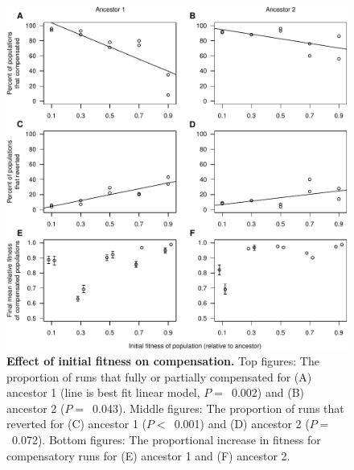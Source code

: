 \begin{doublespace}
\begin{figure}
\begin{center}
\includegraphics[width=\linewidth]{effect-W.pdf}
\end{center}
\caption{{\bf Effect of initial fitness on compensation.}
  Top figures: The proportion of runs that fully or partially compensated
  for (A) ancestor 1 (line is best fit linear model, $P =$~0.002) and
  (B) ancestor 2 ($P =$~0.043).
  Middle figures: The proportion of runs that reverted
  for (C) ancestor 1 ($P <$~0.001) and (D) ancestor 2 ($P =$~0.072).
  Bottom figures: The proportional increase in fitness for compensatory runs
  for (E) ancestor 1 and (F) ancestor 2.}
\label{fig:W_comp}
\end{figure}




\end{doublespace}
